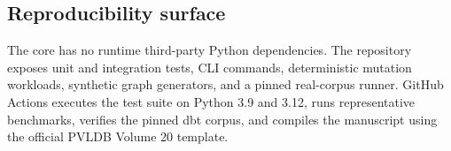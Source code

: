 \subsection{Reproducibility surface}

The core has no runtime third-party Python dependencies. The repository exposes unit and integration tests, CLI commands, deterministic mutation workloads, synthetic graph generators, and a pinned real-corpus runner. GitHub Actions executes the test suite on Python 3.9 and 3.12, runs representative benchmarks, verifies the pinned dbt corpus, and compiles the manuscript using the official PVLDB Volume 20 template.
